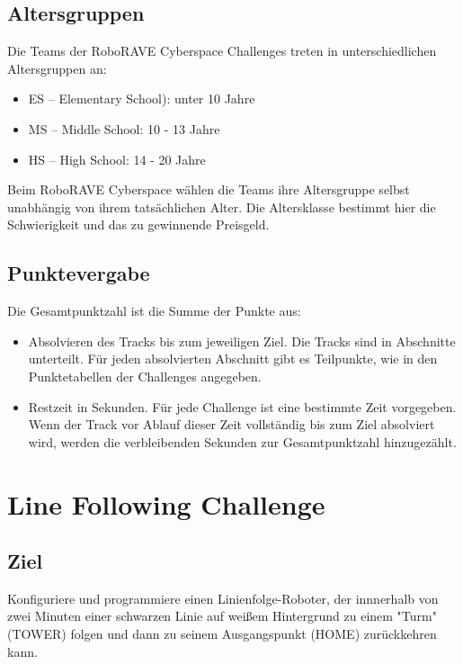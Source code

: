 \documentclass[a4paper,12pt]{article}
\begin{document}
\subsection{Altersgruppen}

Die Teams der RoboRAVE Cyberspace Challenges treten in unterschiedlichen
Altersgruppen an:

\begin{itemize}
	\item ES – Elementary School): unter 10 Jahre
	\item MS – Middle School: 10 - 13 Jahre
	\item HS – High School: 14 - 20 Jahre
\end{itemize}

Beim RoboRAVE Cyberspace wählen die Teams ihre Altersgruppe selbst unabhängig
von ihrem tatsächlichen Alter. Die Altersklasse bestimmt hier die Schwierigkeit
und das zu gewinnende Preisgeld.

\subsection{Punktevergabe}

Die Gesamtpunktzahl ist die Summe der Punkte aus:
\begin{itemize}
	\item Absolvieren des Tracks bis zum jeweiligen Ziel. Die Tracks sind
in Abschnitte unterteilt. Für jeden absolvierten Abschnitt gibt es Teilpunkte,
wie in den Punktetabellen der Challenges angegeben.
	\item Restzeit in Sekunden. Für jede Challenge ist eine bestimmte Zeit
vorgegeben. Wenn der Track vor Ablauf dieser Zeit vollständig bis zum Ziel
absolviert wird, werden die verbleibenden Sekunden zur Gesamtpunktzahl
hinzugezählt.
\end{itemize}

\section{Line Following Challenge}

\subsection{Ziel}

Konfiguriere und programmiere einen Linienfolge-Roboter, der innnerhalb von
zwei Minuten einer schwarzen Linie auf weißem Hintergrund zu einem "Turm"
(TOWER) folgen und dann zu seinem Ausgangspunkt (HOME) zurückkehren kann.
\end{document}
